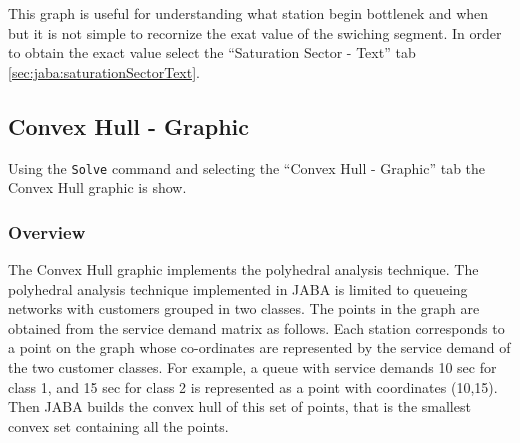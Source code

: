 This graph is useful for understanding what station begin bottlenek and when but it is not simple to recornize the exat value of the swiching segment. In order to obtain the exact value select the ``Saturation Sector - Text'' tab \autoref{sec:jaba:saturationSectorText}.



\subsection{Convex Hull - Graphic}
\label{sec:jaba:convexHullGraphic}

Using the \texttt{Solve} command and selecting the ``Convex Hull - Graphic''
tab the Convex Hull graphic is show.

\subsubsection{Overview}
The Convex Hull graphic implements the polyhedral analysis technique.
The polyhedral analysis technique implemented in JABA is limited to queueing networks with customers grouped in two classes. The points in the graph are obtained from the service demand matrix as follows. Each station corresponds to a point on the graph whose co-ordinates are represented by the service demand of the two customer classes. For example, a queue with service demands 10 sec for class 1, and 15 sec for class 2 is represented as a point with coordinates (10,15).  Then JABA builds the convex hull of this set of points, that is the smallest convex set containing all the points.


